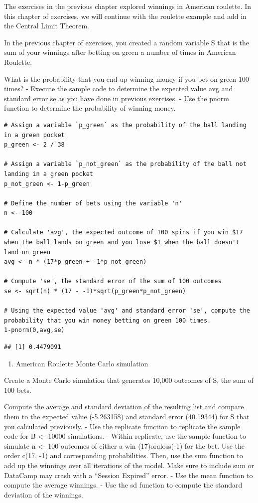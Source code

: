 \documentclass[
]{article}
\providecommand{\tightlist}{%
  \setlength{\itemsep}{0pt}\setlength{\parskip}{0pt}}
\begin{document}
The exercises in the previous chapter explored winnings in American
roulette. In this chapter of exercises, we will continue with the
roulette example and add in the Central Limit Theorem.

In the previous chapter of exercises, you created a random variable S
that is the sum of your winnings after betting on green a number of
times in American Roulette.

What is the probability that you end up winning money if you bet on
green 100 times? - Execute the sample code to determine the expected
value avg and standard error se as you have done in previous exercises.
- Use the pnorm function to determine the probability of winning money.

\begin{verbatim}
# Assign a variable `p_green` as the probability of the ball landing in a green pocket
p_green <- 2 / 38

# Assign a variable `p_not_green` as the probability of the ball not landing in a green pocket
p_not_green <- 1-p_green

# Define the number of bets using the variable 'n'
n <- 100

# Calculate 'avg', the expected outcome of 100 spins if you win $17 when the ball lands on green and you lose $1 when the ball doesn't land on green
avg <- n * (17*p_green + -1*p_not_green)

# Compute 'se', the standard error of the sum of 100 outcomes
se <- sqrt(n) * (17 - -1)*sqrt(p_green*p_not_green)

# Using the expected value 'avg' and standard error 'se', compute the probability that you win money betting on green 100 times.
1-pnorm(0,avg,se)
\end{verbatim}

\begin{verbatim}
## [1] 0.4479091
\end{verbatim}

\begin{enumerate}
\def\labelenumi{\arabic{enumi}.}
\setcounter{enumi}{1}
\tightlist
\item
  American Roulette Monte Carlo simulation
\end{enumerate}

Create a Monte Carlo simulation that generates 10,000 outcomes of S, the
sum of 100 bets.

Compute the average and standard deviation of the resulting list and
compare them to the expected value (-5.263158) and standard error
(40.19344) for S that you calculated previously. - Use the replicate
function to replicate the sample code for B \textless- 10000
simulations. - Within replicate, use the sample function to simulate n
\textless- 100 outcomes of either a win (17)oraloss(-1) for the bet. Use
the order c(17, -1) and corresponding probabilities. Then, use the sum
function to add up the winnings over all iterations of the model. Make
sure to include sum or DataCamp may crash with a ``Session Expired''
error. - Use the mean function to compute the average winnings. - Use
the sd function to compute the standard deviation of the winnings.
\end{document}
